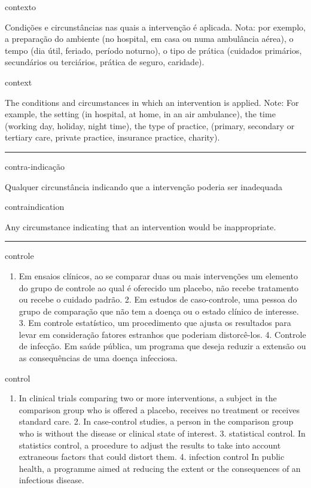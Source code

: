\documentclass[
]{book}
\providecommand{\tightlist}{%
  \setlength{\itemsep}{0pt}\setlength{\parskip}{0pt}}
\begin{document}
contexto

Condições e circunstâncias nas quais a intervenção é aplicada. Nota: por exemplo, a preparação do ambiente (no hospital, em casa ou numa ambulância aérea), o tempo (dia útil, feriado, período noturno), o tipo de prática (cuidados primários, secundários ou terciários, prática de seguro, caridade).

context

The conditions and circumstances in which an intervention is applied. Note: For example, the setting (in hospital, at home, in an air ambulance), the time (working day, holiday, night time), the type of practice, (primary, secondary or tertiary care, private practice, insurance practice, charity).

\begin{center}\rule{0.5\linewidth}{0.5pt}\end{center}

contra-indicação

Qualquer circunstância indicando que a intervenção poderia ser inadequada

contraindication

Any circumstance indicating that an intervention would be inappropriate.

\begin{center}\rule{0.5\linewidth}{0.5pt}\end{center}

controle

\begin{enumerate}
\def\labelenumi{\arabic{enumi}.}
\tightlist
\item
  Em ensaios clínicos, ao se comparar duas ou mais intervenções um elemento do grupo de controle ao qual é oferecido um placebo, não recebe tratamento ou recebe o cuidado padrão. 2. Em estudos de caso-controle, uma pessoa do grupo de comparação que não tem a doença ou o estado clínico de interesse. 3. Em controle estatístico, um procedimento que ajusta os resultados para levar em consideração fatores estranhos que poderiam distorcê-los. 4. Controle de infecção. Em saúde pública, um programa que deseja reduzir a extensão ou as consequências de uma doença infecciosa.
\end{enumerate}

control

\begin{enumerate}
\def\labelenumi{\arabic{enumi}.}
\tightlist
\item
  In clinical trials comparing two or more interventions, a subject in the comparison group who is offered a placebo, receives no treatment or receives standard care. 2. In case-control studies, a person in the comparison group who is without the disease or clinical state of interest. 3. statistical control. In statistics control, a procedure to adjust the results to take into account extraneous factors that could distort them. 4. infection control
  In public health, a programme aimed at reducing the extent or the consequences of an infectious disease.
\end{enumerate}
\end{document}
